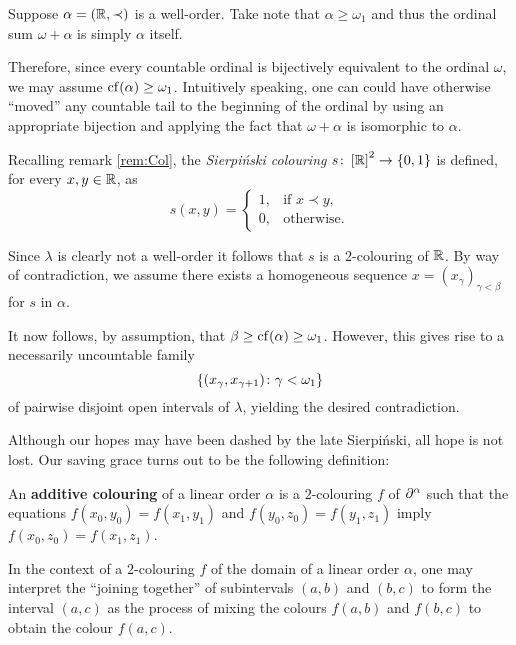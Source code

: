 \begin{exm}
	Suppose $\alpha=(\mathbb{R},\prec)$ is a well-order.  Take note that
	$\alpha\geq\omega_1$ and thus the ordinal sum $\omega+\alpha$ is simply
	$\alpha$ itself.

	Therefore, since every countable ordinal is bijectively equivalent to the
	ordinal $\omega$, we may assume $\operatorname{cf}(\alpha)\geq\omega_1$.  Intuitively
	speaking, one can could have otherwise ``moved'' any countable tail to the
	beginning of the ordinal by using an appropriate bijection and applying the
	fact that $\omega+\alpha$ is isomorphic to $\alpha$.

	Recalling remark \ref{rem:Col}, the \textit{Sierpi\'nski colouring}
	$s\colon\left[\mathbb{R}\right]^{2}\to\left\lbrace 0,1\right\rbrace$ is defined, for every
	$x,y\in\mathbb{R}$, as
	\begin{equation}
		s(x,y)=
		\begin{cases}
			1,  &\text{if }x\prec y,\\
			0,   &\text{otherwise.}
		\end{cases}
	\end{equation}

	Since $\lambda$ is clearly not a well-order it follows that $s$ is a
	$2$-colouring of $\mathbb{R}$.  By way of contradiction, we assume there
	exists a homogeneous sequence $x=(x_{\gamma})_{\gamma<\beta}$ for $s$ in
	$\alpha$.

	It now follows, by assumption, that $\beta\geq\operatorname{cf}(\alpha)\geq\omega_1$.
	However, this gives rise to a necessarily uncountable family
	\begin{equation}
		\left\lbrace (x_\gamma,x_{\gamma+1})\colon \gamma<\omega_1 \right\rbrace
	\end{equation}
	of pairwise disjoint open intervals of $\lambda$, yielding the desired
	contradiction.
\end{exm}

Although our hopes may have been dashed by the late Sierpi\'nski, all hope is
not lost.  Our saving grace turns out to be the following definition:
\begin{dfn}
	An \textbf{additive colouring} of a linear order $\alpha$ is a $2$-colouring
	$f$ of $\partial^{\alpha}$ such that the equations $f(x_0,y_0)=f(x_1,y_1)$ and
	$f(y_0,z_0)=f(y_1,z_1)$ imply $f(x_0,z_0)=f(x_1,z_1)$.
\end{dfn}

In the context of a $2$-colouring $f$ of the domain of a linear order $\alpha$,
one may interpret the ``joining together'' of subintervals $(a,b)$ and $(b,c)$
to form the interval $(a,c)$ as the process of mixing the colours $f(a,b)$ and
$f(b,c)$ to obtain the colour $f(a,c)$.

